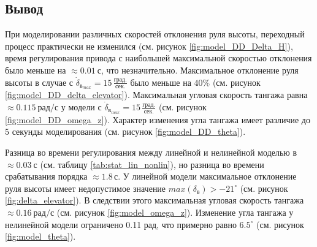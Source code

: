 \subsection{Вывод}
При моделировании различных скоростей отклонения руля высоты, переходный
процесс практически не изменился (см. рисунок \ref{fig:model_DD_Delta_H}), время
регулирования привода с наибольшей максимальной скоростью отклонения было
меньше на $\approx 0.01\ с$, что незначительно. Максимальное отклонение руля высоты в случае с
$\dot{\delta}_{{в}_{max}} = 15\, \frac{\text{град.}}{\text{сек.}}$ было меньше
на $40 \%$ (см. рисунок \ref{fig:model_DD_delta_elevator}). Максимальная
угловая скорость тангажа равна $\approx 0.115\ \text{рад/с}$ у модели с
$\dot{\delta}_{{в}_{max}} = 15\, \frac{\text{град.}}{\text{сек.}}$ (см. рисунок
\ref{fig:model_DD_omega_z}). Характер изменения угла тангажа имеет различие до
5 секунды моделирования (см. рисунок \ref{fig:model_DD_theta}).

Разница во времени регулирования между линейной и нелинейной моделью в $\approx
0.03\ с$ (см. таблицу \ref{tab:stat_lin_nonlin}), но разница во времени
срабатывания порядка $\approx 1.8\, с$. У линейной модели максимальное
отклонение руля высоты имеет недопустимое значение $max(\delta_{в}) >
-21^\circ$ (см. рисунок \ref{fig:delta_elevator}). В следствии этого
максимальная угловая скорость тангажа $\approx 0.16 \ \text{рад/с}$ (см.
рисунок \ref{fig:model_omega_z}). Изменение угла тангажа у нелинейной модели
ограничено 0.11 рад, что примерно равно $6.5^\circ$ (см. рисунок \ref{fig:model_theta}).

